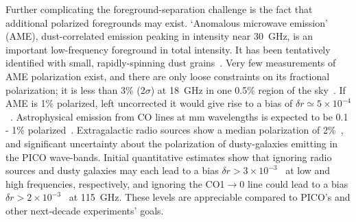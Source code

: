 \documentclass[PICOReport.tex]{subfiles}
\begin{document}

Further complicating the foreground-separation challenge is the fact that additional polarized foregrounds may exist.  
`Anomalous microwave emission' (AME), dust-correlated emission peaking in intensity near 30~GHz, is an important low-frequency foreground in total intensity. 
It has been tentatively identified with small, rapidly-spinning dust grains~\citep{dickinson/etal:2018}. Very few measurements of AME polarization exist, and there are only loose constraints on its fractional polarization; it is less than 3\% (2$\sigma$) at 18~GHz in one 0.5\% region of the sky~\citep{genova_santos:2015}.  If AME is 1\% polarized, left uncorrected it would give rise to a bias of $\delta r \simeq 5\times10^{-4}$~\citep{remazeilles2016}.  Astrophysical emission from CO lines at mm wavelengths is expected to be 0.1 - 1\% polarized~\citep{greeves1999, puglisi2017}.  Extragalactic radio sources show a median polarization of 2\%~\citep{Bonavera2018, puglisi2018_polsource, trombetti2018_fracpol}, and significant uncertainty about the polarization of dusty-galaxies emitting in the PICO wave-bands. Initial quantitative estimates show that ignoring radio sources and dusty galaxies may each lead to a bias $\delta r > 3\times10^{-3}$~\citep{toffolatti2012,Bonavera2018,remazeilles2018}  %
at low and high frequencies, respectively, and ignoring the CO1$\rightarrow$0 line could lead to a bias $\delta r > 2\times10^{-3}$~\citep{puglisi2017} at 115~GHz. %
These levels are appreciable compared to PICO's and other next-decade experiments' goals. 
\end{document}
